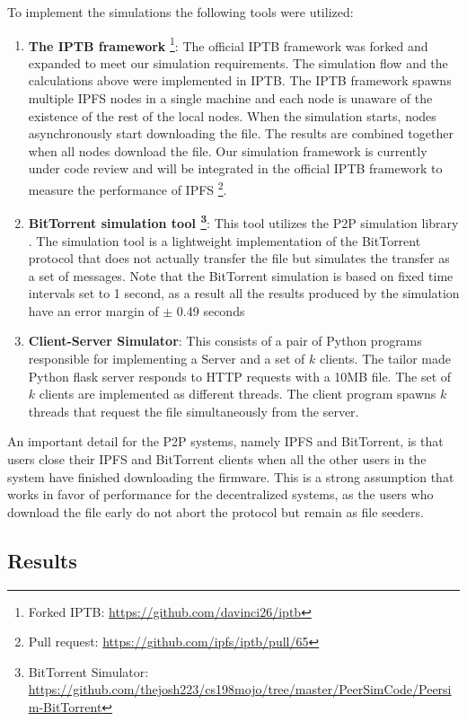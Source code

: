 {{{To implement the simulations the following tools were utilized:
\begin{enumerate}
\item \textbf{The IPTB framework} \footnote{Forked IPTB: \url{https://github.com/davinci26/iptb}}: The official IPTB framework was forked and expanded to meet our simulation requirements. The simulation flow and the calculations above were implemented in IPTB. The IPTB framework spawns multiple IPFS nodes in a single machine and each node is unaware of the existence of the rest of the local nodes. When the simulation starts, nodes asynchronously start downloading the file. The results are combined together when all nodes download the file. Our simulation framework is currently under code review and will be integrated in the official IPTB framework to measure the performance of IPFS \footnote{Pull request: \url{https://github.com/ipfs/iptb/pull/65}}.
\item \textbf{BitTorrent simulation tool \footnote{BitTorrent Simulator: \url{https://github.com/thejosh223/cs198mojo/tree/master/PeerSimCode/Peersim-BitTorrent}}}: This tool utilizes the P2P simulation library \cite{p2p09-peersim}. The simulation tool is a lightweight implementation of the BitTorrent protocol that does not actually transfer the file but simulates the transfer as a set of messages. Note that the BitTorrent simulation is based on fixed time intervals set to 1 second, as a result all the results produced by the simulation have an error margin of $\pm$ 0.49 seconds
\item \textbf{Client-Server Simulator}: This consists of a pair of Python programs responsible for implementing a Server and a set of $k$ clients. The tailor made Python flask server \cite{flask} responds to HTTP requests with a 10MB file. The set of $k$ clients  are implemented as different threads. The client program spawns $k$ threads that request the file simultaneously from the server.
\end{enumerate}
}
An important detail for the P2P systems, namely IPFS and BitTorrent, is that users close their IPFS and BitTorrent clients when all the other users in the system have finished downloading the firmware. This is a strong assumption that works in favor of performance for the decentralized systems, as the users who download the file early do not abort the protocol but remain as file seeders. 

\subsection{Results}{

}}}

